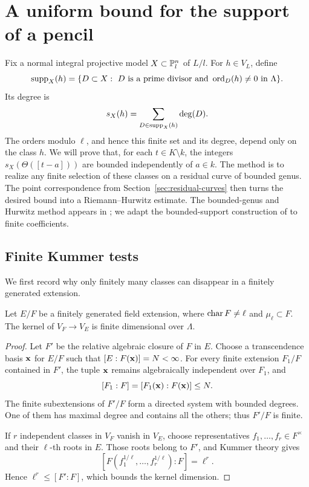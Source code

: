 \section{A uniform bound for the support of a pencil}
\label{sec:support}

Fix a normal integral projective model $X\subset\mathbb P_l^n$ of $L/l$.
For $h\in V_L$, define
\[
 \operatorname{supp}_X(h)=\{D\subset X:\ D\text{ is a prime divisor and }
                         \operatorname{ord}_D(h)\ne0\text{ in }\Lambda\}.
\]
Its degree is
\[
 s_X(h)=\sum_{D\in\operatorname{supp}_X(h)}\deg(D).
\]
The orders modulo $\ell$, and hence this finite set and its degree, depend
only on the class $h$.  We will prove that, for each $t\in K\setminus k$,
the integers $s_X(\Theta([t-a]))$ are bounded independently of $a\in k$.
The method is to realize any finite selection of these classes on a
residual curve of bounded genus.  The point correspondence from
Section~\ref{sec:residual-curves} then turns the desired bound into a
Riemann--Hurwitz estimate.  The bounded-genus and Hurwitz method appears
in \cite[Section~6, proof of Proposition~6.1]{BT2011}; we adapt the
bounded-support construction of \cite[Sections~4--6]{InternalBP} to
finite coefficients.

\subsection{Finite Kummer tests}

We first record why only finitely many classes can disappear in a
finitely generated extension.

\begin{lemma}\label{lem:kummer-kernel}
Let $E/F$ be a finitely generated field extension, where
$\operatorname{char} F\ne\ell$ and $\mu_\ell\subset F$.  The kernel of
$V_F\longrightarrow V_E$ is finite dimensional over $\Lambda$.
\end{lemma}

\begin{proof}
Let $F'$ be the relative algebraic closure of $F$ in $E$.
Choose a transcendence basis ${\bf x}$ for $E/F$ such that
$[E:F({\bf x})]=N<\infty$.  For every finite extension $F_1/F$
contained in $F'$, the tuple ${\bf x}$ remains algebraically independent
over $F_1$, and
\[
 [F_1:F]=[F_1({\bf x}):F({\bf x})]\le N.
\]
The finite subextensions of $F'/F$ form a directed system with bounded
degrees.  One of them has maximal degree and contains all the others;
thus $F'/F$ is finite.

If $r$ independent classes in $V_F$ vanish in $V_E$, choose
representatives $f_1,\ldots,f_r\in F^\times$ and their $\ell$-th roots
in $E$.  Those roots belong to $F'$, and Kummer theory gives
\[
 [F(f_1^{1/\ell},\ldots,f_r^{1/\ell}):F]=\ell^r.
\]
Hence $\ell^r\le [F':F]$, which bounds the kernel dimension.
\end{proof}


